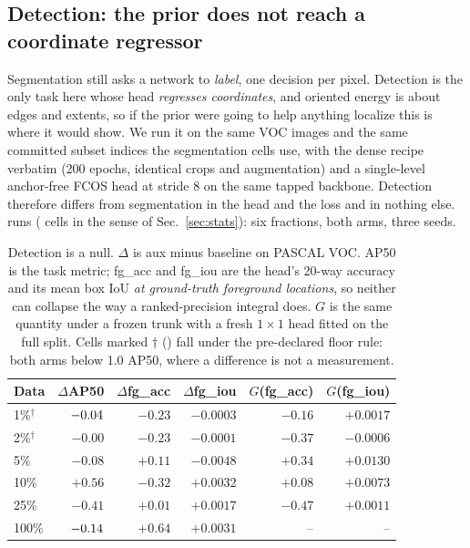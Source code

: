 \subsection{Detection: the prior does not reach a coordinate
regressor}\label{sec:detection} Segmentation still asks a network to
\emph{label}, one decision per pixel. Detection is the only task here whose
head \emph{regresses coordinates}, and oriented energy is about edges and
extents, so if the prior were going to help anything localize this is where it
would show. We run it on the same VOC images and the same committed subset
indices the segmentation cells use, with the dense recipe verbatim (200 epochs,
identical crops and augmentation) and a single-level anchor-free FCOS head at
stride 8 on the same tapped backbone. Detection therefore differs from
segmentation in the head and the loss and in nothing else. \detCells{} runs
(\detCellCount{} cells in the sense of Sec.~\ref{sec:stats}): six fractions,
both arms, three seeds.

\begin{table}[pos=htbp]
\caption{Detection is a null. $\Delta$ is aux minus baseline on PASCAL VOC.
AP50 is the task metric; fg\_acc and fg\_iou are the head's 20-way accuracy and
its mean box IoU \emph{at ground-truth foreground locations}, so neither can
collapse the way a ranked-precision integral does. $G$ is the same quantity
under a frozen trunk with a fresh $1\times1$ head fitted on the full split.
Cells marked $\dagger$ (\detFloorPcts) fall under the pre-declared floor rule:
both arms below 1.0 AP50, where a difference is not a measurement.}
\label{tab:det}
\centering\scriptsize
\setlength{\tabcolsep}{3.6pt}
\begin{tabular}{lrrrrr}
\toprule
Data & $\Delta$AP50 & $\Delta$fg\_acc & $\Delta$fg\_iou & $G$(fg\_acc) & $G$(fg\_iou) \\
\midrule
1\%$^\dagger$  & $-0.04$ & $-0.23$ & $-0.0003$ & $-0.16$ & $+0.0017$ \\
2\%$^\dagger$  & $-0.00$ & $-0.23$ & $-0.0001$ & $-0.37$ & $-0.0006$ \\
5\%            & $-0.08$ & $+0.11$ & $-0.0048$ & $+0.34$ & $+0.0130$ \\
10\%           & $+0.56$ & $-0.32$ & $+0.0032$ & $+0.08$ & $+0.0073$ \\
25\%           & $-0.41$ & $+0.01$ & $+0.0017$ & $-0.47$ & $+0.0011$ \\
100\%          & $-0.14$ & $+0.64$ & $+0.0031$ & --      & --        \\
\bottomrule
\end{tabular}
\end{table}

